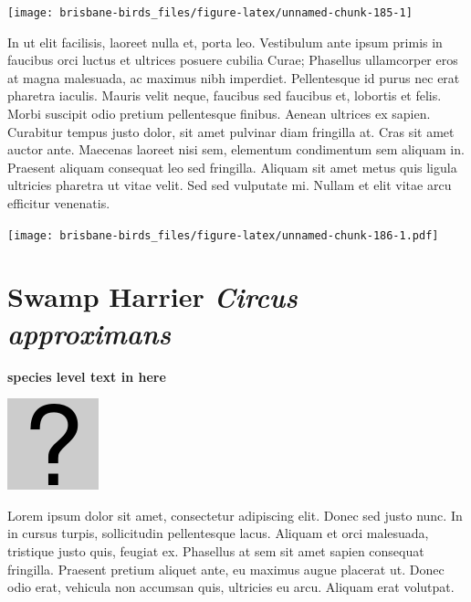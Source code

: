 \documentclass[]{book}
\let\origfigure\figure
\let\endorigfigure\endfigure
\renewenvironment{figure}[1][2] {
  \expandafter\origfigure\expandafter[H]
} {
  \endorigfigure
}
\begin{document}
\begin{figure}
\texttt{[image: brisbane-birds\_files/figure-latex/unnamed-chunk-185-1]} \caption{insert figure caption}\label{fig:unnamed-chunk-185}
\end{figure}

In ut elit facilisis, laoreet nulla et, porta leo. Vestibulum ante ipsum
primis in faucibus orci luctus et ultrices posuere cubilia Curae;
Phasellus ullamcorper eros at magna malesuada, ac maximus nibh
imperdiet. Pellentesque id purus nec erat pharetra iaculis. Mauris velit
neque, faucibus sed faucibus et, lobortis et felis. Morbi suscipit odio
pretium pellentesque finibus. Aenean ultrices ex sapien. Curabitur
tempus justo dolor, sit amet pulvinar diam fringilla at. Cras sit amet
auctor ante. Maecenas laoreet nisi sem, elementum condimentum sem
aliquam in. Praesent aliquam consequat leo sed fringilla. Aliquam sit
amet metus quis ligula ultricies pharetra ut vitae velit. Sed sed
vulputate mi. Nullam et elit vitae arcu efficitur venenatis.

\begin{figure}
\centering
\texttt{[image: brisbane-birds\_files/figure-latex/unnamed-chunk-186-1.pdf]}
\caption{\label{fig:unnamed-chunk-186}insert figure caption}
\end{figure}

\section{\texorpdfstring{Swamp Harrier \emph{Circus
approximans}}{Swamp Harrier Circus approximans}}\label{swamp-harrier-circus-approximans}

\textbf{species level text in here}

\begin{figure}
\centering
\includegraphics{assets/missing.png}
\caption{No image for species}
\end{figure}

Lorem ipsum dolor sit amet, consectetur adipiscing elit. Donec sed justo
nunc. In in cursus turpis, sollicitudin pellentesque lacus. Aliquam et
orci malesuada, tristique justo quis, feugiat ex. Phasellus at sem sit
amet sapien consequat fringilla. Praesent pretium aliquet ante, eu
maximus augue placerat ut. Donec odio erat, vehicula non accumsan quis,
ultricies eu arcu. Aliquam erat volutpat.
\end{document}
